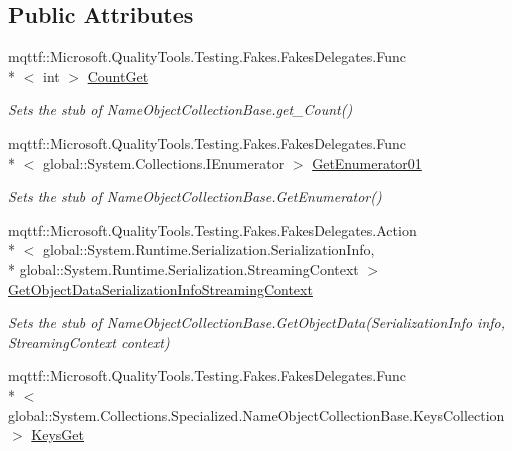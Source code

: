 \subsection*{Public Attributes}
\begin{DoxyCompactItemize}
\item 
mqttf\-::\-Microsoft.\-Quality\-Tools.\-Testing.\-Fakes.\-Fakes\-Delegates.\-Func\\*
$<$ int $>$ \hyperlink{class_system_1_1_collections_1_1_specialized_1_1_fakes_1_1_stub_name_object_collection_base_a978c0f4868b9f34d91b140862b8cded5}{Count\-Get}
\begin{DoxyCompactList}\small\item\em Sets the stub of Name\-Object\-Collection\-Base.\-get\-\_\-\-Count()\end{DoxyCompactList}\item 
mqttf\-::\-Microsoft.\-Quality\-Tools.\-Testing.\-Fakes.\-Fakes\-Delegates.\-Func\\*
$<$ global\-::\-System.\-Collections.\-I\-Enumerator $>$ \hyperlink{class_system_1_1_collections_1_1_specialized_1_1_fakes_1_1_stub_name_object_collection_base_afa940e9f62cbdd78634fe1c08e1a0485}{Get\-Enumerator01}
\begin{DoxyCompactList}\small\item\em Sets the stub of Name\-Object\-Collection\-Base.\-Get\-Enumerator()\end{DoxyCompactList}\item 
mqttf\-::\-Microsoft.\-Quality\-Tools.\-Testing.\-Fakes.\-Fakes\-Delegates.\-Action\\*
$<$ global\-::\-System.\-Runtime.\-Serialization.\-Serialization\-Info, \\*
global\-::\-System.\-Runtime.\-Serialization.\-Streaming\-Context $>$ \hyperlink{class_system_1_1_collections_1_1_specialized_1_1_fakes_1_1_stub_name_object_collection_base_a3f7621e9abba0225c5d8cf4bc5b47b55}{Get\-Object\-Data\-Serialization\-Info\-Streaming\-Context}
\begin{DoxyCompactList}\small\item\em Sets the stub of Name\-Object\-Collection\-Base.\-Get\-Object\-Data(\-Serialization\-Info info, Streaming\-Context context)\end{DoxyCompactList}\item 
mqttf\-::\-Microsoft.\-Quality\-Tools.\-Testing.\-Fakes.\-Fakes\-Delegates.\-Func\\*
$<$ global\-::\-System.\-Collections.\-Specialized.\-Name\-Object\-Collection\-Base.\-Keys\-Collection $>$ \hyperlink{class_system_1_1_collections_1_1_specialized_1_1_fakes_1_1_stub_name_object_collection_base_a7397eda0e20f6cadbbeba6cc82c5ef01}{Keys\-Get}

\end{DoxyCompactItemize}
